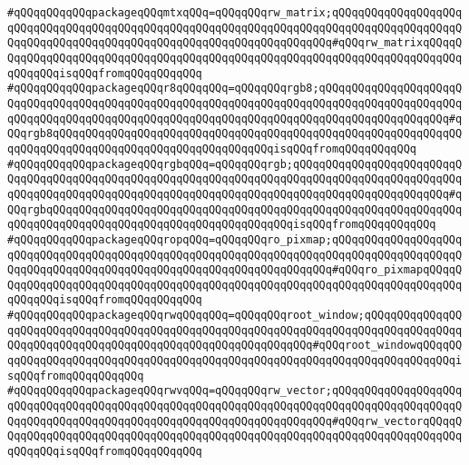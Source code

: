 \verb|#qQQqqQQqqQQqpackageqQQqmtxqQQq=qQQqqQQqrw_matrix;qQQqqQQqqQQqqQQqqQQqqQQqqQQqqQQqqQQqqQQqqQQqqQQqqQQqqQQqqQQqqQQqqQQqqQQqqQQqqQQqqQQqqQQqqQQqqQQqqQQqqQQqqQQqqQQqqQQqqQQqqQQqqQQqqQQqqQQqqQQq#qQQqrw_matrixqQQqqQQqqQQqqQQqqQQqqQQqqQQqqQQqqQQqqQQqqQQqqQQqqQQqqQQqqQQqqQQqqQQqqQQqqQQqqQQqqQQqisqQQqfromqQQqqQQqqQQq|\newline
\verb|#qQQqqQQqqQQqpackageqQQqr8qQQqqQQq=qQQqqQQqrgb8;qQQqqQQqqQQqqQQqqQQqqQQqqQQqqQQqqQQqqQQqqQQqqQQqqQQqqQQqqQQqqQQqqQQqqQQqqQQqqQQqqQQqqQQqqQQqqQQqqQQqqQQqqQQqqQQqqQQqqQQqqQQqqQQqqQQqqQQqqQQqqQQqqQQqqQQqqQQqqQQq#qQQqrgb8qQQqqQQqqQQqqQQqqQQqqQQqqQQqqQQqqQQqqQQqqQQqqQQqqQQqqQQqqQQqqQQqqQQqqQQqqQQqqQQqqQQqqQQqqQQqqQQqqQQqqQQqisqQQqfromqQQqqQQqqQQq|\newline
\verb|#qQQqqQQqqQQqpackageqQQqrgbqQQq=qQQqqQQqrgb;qQQqqQQqqQQqqQQqqQQqqQQqqQQqqQQqqQQqqQQqqQQqqQQqqQQqqQQqqQQqqQQqqQQqqQQqqQQqqQQqqQQqqQQqqQQqqQQqqQQqqQQqqQQqqQQqqQQqqQQqqQQqqQQqqQQqqQQqqQQqqQQqqQQqqQQqqQQqqQQqqQQq#qQQqrgbqQQqqQQqqQQqqQQqqQQqqQQqqQQqqQQqqQQqqQQqqQQqqQQqqQQqqQQqqQQqqQQqqQQqqQQqqQQqqQQqqQQqqQQqqQQqqQQqqQQqqQQqqQQqisqQQqfromqQQqqQQqqQQq|\newline
\verb|#qQQqqQQqqQQqpackageqQQqropqQQq=qQQqqQQqro_pixmap;qQQqqQQqqQQqqQQqqQQqqQQqqQQqqQQqqQQqqQQqqQQqqQQqqQQqqQQqqQQqqQQqqQQqqQQqqQQqqQQqqQQqqQQqqQQqqQQqqQQqqQQqqQQqqQQqqQQqqQQqqQQqqQQqqQQqqQQqqQQq#qQQqro_pixmapqQQqqQQqqQQqqQQqqQQqqQQqqQQqqQQqqQQqqQQqqQQqqQQqqQQqqQQqqQQqqQQqqQQqqQQqqQQqqQQqqQQqisqQQqfromqQQqqQQqqQQq|\newline
\verb|#qQQqqQQqqQQqpackageqQQqrwqQQqqQQq=qQQqqQQqroot_window;qQQqqQQqqQQqqQQqqQQqqQQqqQQqqQQqqQQqqQQqqQQqqQQqqQQqqQQqqQQqqQQqqQQqqQQqqQQqqQQqqQQqqQQqqQQqqQQqqQQqqQQqqQQqqQQqqQQqqQQqqQQqqQQqqQQq#qQQqroot_windowqQQqqQQqqQQqqQQqqQQqqQQqqQQqqQQqqQQqqQQqqQQqqQQqqQQqqQQqqQQqqQQqqQQqqQQqqQQqisqQQqfromqQQqqQQqqQQq|\newline
\verb|#qQQqqQQqqQQqpackageqQQqrwvqQQq=qQQqqQQqrw_vector;qQQqqQQqqQQqqQQqqQQqqQQqqQQqqQQqqQQqqQQqqQQqqQQqqQQqqQQqqQQqqQQqqQQqqQQqqQQqqQQqqQQqqQQqqQQqqQQqqQQqqQQqqQQqqQQqqQQqqQQqqQQqqQQqqQQqqQQqqQQq#qQQqrw_vectorqQQqqQQqqQQqqQQqqQQqqQQqqQQqqQQqqQQqqQQqqQQqqQQqqQQqqQQqqQQqqQQqqQQqqQQqqQQqqQQqqQQqisqQQqfromqQQqqQQqqQQq|\newline

